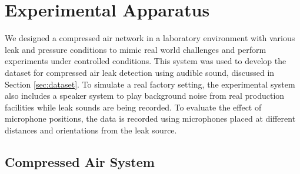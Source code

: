\section{Experimental Apparatus}\label{sec:app}

We designed a compressed air network in a laboratory environment with various leak and pressure conditions to mimic real world challenges and perform experiments under controlled conditions. 
This system was used to develop the dataset for compressed air leak detection using audible sound, discussed in Section \ref{sec:dataset}.
To simulate a real factory setting, the experimental system also includes a speaker system to play background noise from real production facilities while leak sounds are being recorded.
To evaluate the effect of microphone positions, the data is recorded using microphones placed at different distances and orientations from the leak source.

\subsection{Compressed Air System}\label{subsec:app}

